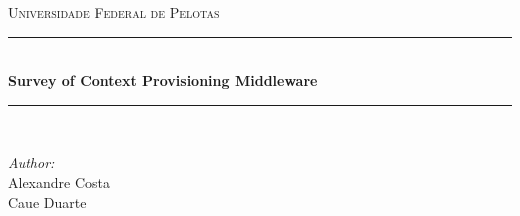 \documentclass[12pt]{article} %
\begin{document}

\begin{titlepage}

\newcommand{\HRule}{\rule{\linewidth}{0.5mm}} %

\center %

\textsc{\LARGE Universidade Federal de Pelotas}\\[1.5cm] %

\HRule \\[0.4cm]
{ \huge \bfseries Survey of Context Provisioning Middleware}\\[0.4cm] %
\HRule \\[1.5cm]

\begin{minipage}{0.4\textwidth}
\begin{flushleft} \large
\emph{Author:}\\
Alexandre Costa \\
Caue Duarte
\end{flushleft}
\end{minipage}

\vfill %

\end{titlepage}


\tableofcontents %

\newpage %

\end{document}
